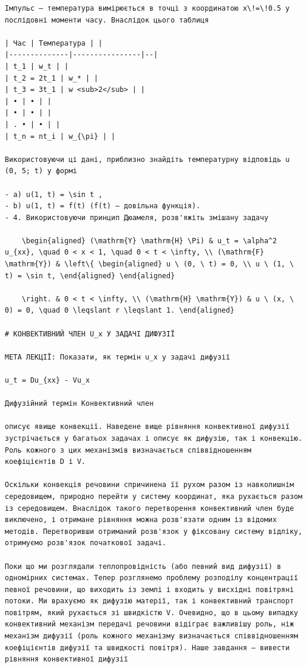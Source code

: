 \documentclass[
  ukrainian,
]{article}
\begin{document}
\begin{verbatim}
Імпульс — температура вимірюється в точці з координатою x\!=\!0.5 у послідовні моменти часу. Внаслідок цього таблиця

| Час | Температура | |
|--------------|----------------|--|
| t_1 | w_t | |
| t_2 = 2t_1 | w_* | |
| t_3 = 3t_1 | w <sub>2</sub> | |
| • | • | |
| • | • | |
| . • | • | |
| t_n = nt_i | w_{\pi} | |

Використовуючи ці дані, приблизно знайдіть температурну відповідь u (0, 5; t) у формі

- a) u(1, t) = \sin t ,
- b) u(1, t) = f(t) (f(t) — довільна функція).
- 4. Використовуючи принцип Дюамеля, розв'яжіть змішану задачу

    \begin{aligned} (\mathrm{Y} \mathrm{H} \Pi) & u_t = \alpha^2 u_{xx}, \quad 0 < x < 1, \quad 0 < t < \infty, \\ (\mathrm{F} \mathrm{Y}) & \left\{ \begin{aligned} u \ (0, \ t) = 0, \\ u \ (1, \ t) = \sin t, \end{aligned} \end{aligned}

    \right. & 0 < t < \infty, \\ (\mathrm{H} \mathrm{Y}) & u \ (x, \ 0) = 0, \quad 0 \leqslant r \leqslant 1. \end{aligned}

# КОНВЕКТИВНИЙ ЧЛЕН U_x У ЗАДАЧІ ДИФУЗІЇ

МЕТА ЛЕКЦІЇ: Показати, як термін u_x у задачі дифузії

u_t = Du_{xx} - Vu_x

Дифузійний термін Конвективний член

описує явище конвекції. Наведене вище рівняння конвективної дифузії зустрічається у багатьох задачах і описує як дифузію, так і конвекцію. Роль кожного з цих механізмів визначається співвідношенням коефіцієнтів D і V.

Оскільки конвекція речовини спричинена її рухом разом із навколишнім середовищем, природно перейти у систему координат, яка рухається разом із середовищем. Внаслідок такого перетворення конвективний член буде виключено, і отримане рівняння можна розв'язати одним із відомих методів. Перетворивши отриманий розв'язок у фіксовану систему відліку, отримуємо розв'язок початкової задачі.

Поки що ми розглядали теплопровідність (або певний вид дифузії) в одномірних системах. Тепер розглянемо проблему розподілу концентрації певної речовини, що виходить із землі і входить у висхідні повітряні потоки. Ми врахуємо як дифузію матерії, так і конвективний транспорт повітрям, який рухається зі швидкістю V. Очевидно, що в цьому випадку конвективний механізм передачі речовини відіграє важливішу роль, ніж механізм дифузії (роль кожного механізму визначається співвідношенням коефіцієнтів дифузії та швидкості повітря). Наше завдання — вивести рівняння конвективної дифузії


\end{verbatim}
\end{document}

